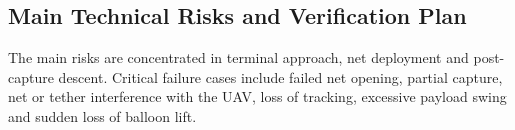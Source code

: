 










\subsection*{Main Technical Risks and Verification Plan}

The main risks are concentrated in terminal approach, net deployment and post-capture descent. Critical failure cases include failed net opening, partial capture, net or tether interference with the UAV, loss of tracking, excessive payload swing and sudden loss of balloon lift.

